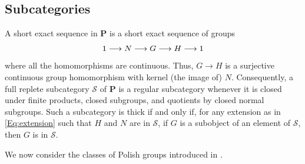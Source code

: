 \documentclass[12pt]{amsart}
\theoremstyle{definition}
\begin{document}
\subsection{Subcategories}

A short exact sequence in $\mathbf{P}$ is a short exact sequence of groups%
\begin{equation}
1\longrightarrow N\longrightarrow G\longrightarrow H\longrightarrow 1\text{%
\label{Eq:extension}}
\end{equation}%
where all the homomorphisms are continuous. Thus, $G\rightarrow H$ is a
surjective continuous group homomorphism with kernel (the image of) $N$.
Consequently, a full replete subcategory $\mathcal{S}$ of $\mathbf{P}$ is a
regular subcategory whenever it is closed under finite products, closed
subgroups, and quotients by closed normal subgroups. Such a subcategory is
thick if and only if, for any extension as in \eqref{Eq:extension} such that 
$H$ and $N$ are in $\mathcal{S}$, if $G$ is a subobject of an element of $%
\mathcal{S}$, then $G$ is in $\mathcal{S}$.

We now consider the classes of Polish groups introduced in %
.
\end{document}
